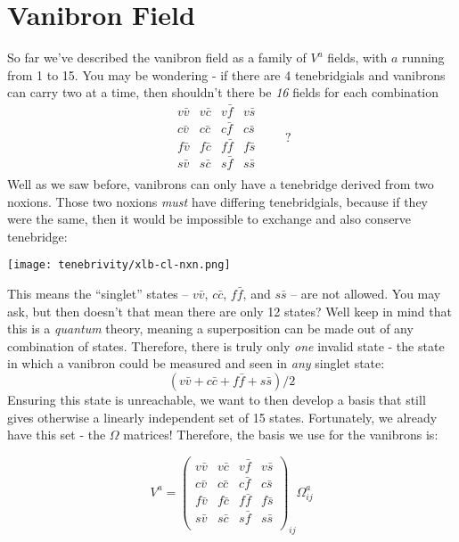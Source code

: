\section{Vanibron Field}
So far we've described the vanibron field as a family of \(V^a\) fields, with \(a\) running from 1 to 15. You may be wondering - if there are 4 tenebridgials and vanibrons can carry two at a time, then shouldn't there be \textit{16} fields for each combination
\[
  \begin{matrix}
    v\bar{v} & v\bar{c} & v\bar{f} & v\bar{s} \\
    c\bar{v} & c\bar{c} & c\bar{f} & c\bar{s} \\
    f\bar{v} & f\bar{c} & f\bar{f} & f\bar{s} \\
    s\bar{v} & s\bar{c} & s\bar{f} & s\bar{s} \\
  \end{matrix}\qquad?
\]
Well as we saw before, vanibrons can only have a tenebridge derived from two noxions. Those two noxions \textit{must} have differing tenebridgials, because if they were the same, then it would be impossible to exchange and also conserve tenebridge:
\begin{center}
  \texttt{[image: tenebrivity/xlb-cl-nxn.png]}
\end{center}
This means the ``singlet'' states -- \(v\bar{v}\), \(c\bar{c}\), \(f\bar{f}\), and \(s\bar{s}\) -- are not allowed. You may ask, but then doesn't that mean there are only 12 states? Well keep in mind that this is a \textit{quantum} theory, meaning a superposition can be made out of any combination of states. Therefore, there is truly only \textit{one} invalid state - the state in which a vanibron could be measured and seen in \textit{any} singlet state:
\[
  \left( v\bar{v} + c\bar{c} + f\bar{f} + s\bar{s} \right)/2
\]
Ensuring this state is unreachable, we want to then develop a basis that still gives otherwise a linearly independent set of 15 states. Fortunately, we already have this set - the \(\Omega\) matrices! Therefore, the basis we use for the vanibrons is:
\begin{definition}
  \[V^a = \begin{pmatrix}
      v\bar{v} & v\bar{c} & v\bar{f} & v\bar{s} \\
      c\bar{v} & c\bar{c} & c\bar{f} & c\bar{s} \\
      f\bar{v} & f\bar{c} & f\bar{f} & f\bar{s} \\
      s\bar{v} & s\bar{c} & s\bar{f} & s\bar{s} \\
    \end{pmatrix}_{ij} \Omega^a_{ij}  \]
\end{definition}

